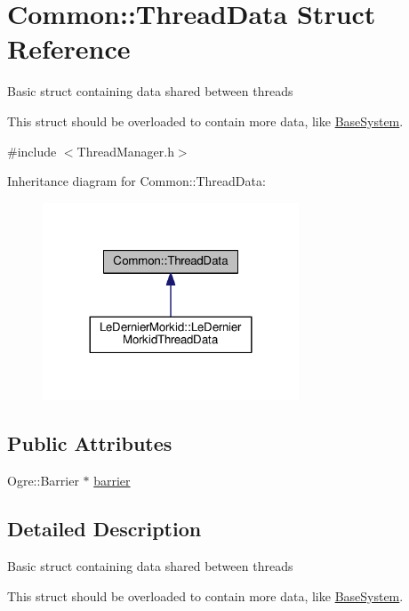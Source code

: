 \hypertarget{struct_common_1_1_thread_data}{}\section{Common\+:\+:Thread\+Data Struct Reference}
\label{struct_common_1_1_thread_data}


Basic struct containing data shared between threads

This struct should be overloaded to contain more data, like \hyperlink{class_common_1_1_base_system}{Base\+System}.  




{\ttfamily \#include $<$Thread\+Manager.\+h$>$}



Inheritance diagram for Common\+:\+:Thread\+Data\+:\nopagebreak
\begin{figure}[H]
\begin{center}
\leavevmode
\includegraphics[width=216pt]{struct_common_1_1_thread_data__inherit__graph}
\end{center}
\end{figure}
\subsection*{Public Attributes}
\begin{DoxyCompactItemize}
\item 
Ogre\+::\+Barrier $\ast$ \hyperlink{struct_common_1_1_thread_data_a75375da6d1b9c59ba64b9fb784b4f326}{barrier}
\end{DoxyCompactItemize}


\subsection{Detailed Description}
Basic struct containing data shared between threads

This struct should be overloaded to contain more data, like \hyperlink{class_common_1_1_base_system}{Base\+System}. 

